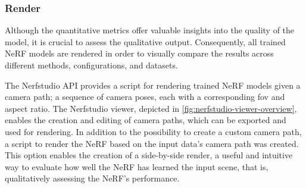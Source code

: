 \subsubsection{Render}

Although the quantitative metrics offer valuable insights into the quality of the model, it is crucial to assess the qualitative output. Consequently, all trained NeRF models are rendered in order to visually compare the results across different methods, configurations, and datasets.

The Nerfstudio API provides a script for rendering trained NeRF models given a camera path; a sequence of camera poses, each with a corresponding \acrshort{fov} and aspect ratio. The Nerfstudio viewer, depicted in \autoref{fig:nerfstudio-viewer-overview}, enables the creation and editing of camera paths, which can be exported and used for rendering. In addition to the possibility to create a custom camera path, a script to render the NeRF based on the input data's camera path was created. This option enables the creation of a side-by-side render, a useful and intuitive way to evaluate how well the NeRF has learned the input scene, that is, qualitatively assessing the NeRF's performance.


%


